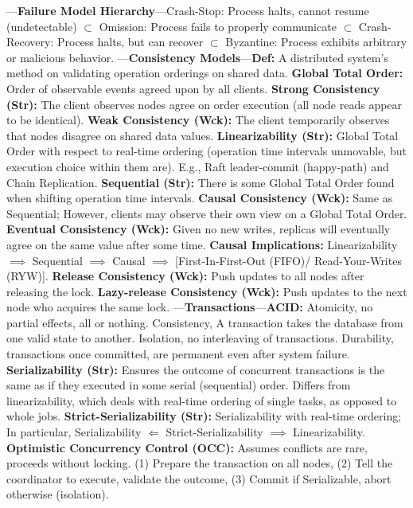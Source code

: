 \newpage 

\begin{multicols}{2}

\noindent
---\textbf{Failure Model Hierarchy}---Crash-Stop: Process halts, cannot resume (undetectable) $\subset$ Omission: Process fails to properly communicate $\subset$ Crash-Recovery: Process halts, but can recover $\subset$ Byzantine: Process exhibits arbitrary or malicious behavior.
---\textbf{Consistency Models}---\textbf{Def:} A distributed system's method on validating operation orderings on shared data.
\textbf{Global Total Order:} Order of observable events agreed upon by all clients. \textbf{Strong Consistency (Str):} The client observes nodes agree on order execution (all node reads appear to be identical).
\textbf{Weak Consistency (Wck):} The client temporarily observes that nodes disagree on shared data values.
\textbf{Linearizability (Str):} Global Total Order with respect to real-time ordering (operation time intervals unmovable, but execution choice within them are). E.g., Raft leader-commit (happy-path) and Chain Replication.
\textbf{Sequential (Str):} There is some Global Total Order found when shifting operation time intervals.
\textbf{Causal Consistency (Wck):} Same as Sequential; However, clients may observe their own view on a Global Total Order.
\textbf{Eventual Consistency (Wck):} Given no new writes, replicas will eventually agree on the same value after some time.
\textbf{Causal Implications:} Linearizability $\implies$ Sequential $\implies$ Causal $\implies$ [First-In-First-Out (FIFO)/ Read-Your-Writes (RYW)].
\textbf{Release Consistency (Wck):} Push updates to all nodes after releasing the lock. 
\textbf{Lazy-release Consistency (Wck):} Push updates to the next node who acquires the same lock.
---\textbf{Transactions}---\textbf{ACID:} Atomicity, no partial effects, all or nothing. Consistency,  A transaction takes the database from one valid state to another. 
Isolation, no interleaving of transactions.
Durability, transactions once committed, are permanent even after system failure.
\textbf{Serializability (Str):} Ensures the outcome of concurrent transactions is the same as if they executed in some serial (sequential) order. Differs from 
linearizability, which deals with real-time ordering of single tasks, as opposed to whole jobs. 
\textbf{Strict-Serializability (Str):} Serializability with real-time ordering; In particular, Serializability $\Longleftarrow$ Strict-Serializability $\implies$ Linearizability.
\textbf{Optimistic Concurrency Control (OCC):} Assumes conflicts are rare, proceeds without locking. (1) Prepare the transaction on all nodes, (2) Tell the coordinator to execute, validate the outcome, (3) Commit if Serializable, abort otherwise (isolation).

\end{multicols}
